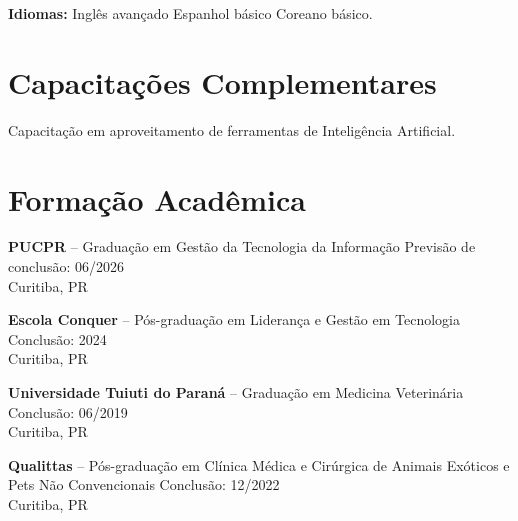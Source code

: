 \documentclass[11pt,a4paper]{article}
\begin{document}
\textbf{Idiomas:} Inglês avançado \textbullet{} Espanhol básico \textbullet{} Coreano básico.

\section*{Capacitações Complementares}

Capacitação em aproveitamento de ferramentas de Inteligência Artificial.

\section*{Formação Acadêmica}

\textbf{PUCPR} -- Graduação em Gestão da Tecnologia da Informação \hfill Previsão de conclusão: 06/2026\\
Curitiba, PR

\textbf{Escola Conquer} -- Pós-graduação em Liderança e Gestão em Tecnologia \hfill Conclusão: 2024\\
Curitiba, PR

\textbf{Universidade Tuiuti do Paraná} -- Graduação em Medicina Veterinária \hfill Conclusão: 06/2019\\
Curitiba, PR

\textbf{Qualittas} -- Pós-graduação em Clínica Médica e Cirúrgica de Animais Exóticos e Pets Não Convencionais \hfill Conclusão: 12/2022\\
Curitiba, PR
\end{document}
